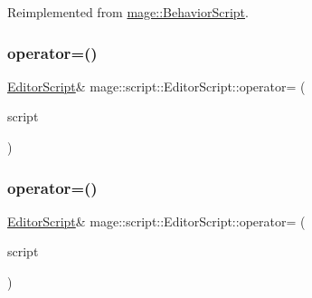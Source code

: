 Reimplemented from \hyperlink{classmage_1_1_behavior_script_aaf2b9f6666064f5b6a6e21b7f1623584}{mage\+::\+Behavior\+Script}.

\hypertarget{classmage_1_1script_1_1_editor_script_a6970965ac503d8c6566268c6d5b78da1}{}\label{classmage_1_1script_1_1_editor_script_a6970965ac503d8c6566268c6d5b78da1} 
\subsubsection{\texorpdfstring{operator=()}{operator=()}\hspace{0.1cm}{\footnotesize\ttfamily [1/2]}}
{\footnotesize\ttfamily \hyperlink{classmage_1_1script_1_1_editor_script}{Editor\+Script}\& mage\+::script\+::\+Editor\+Script\+::operator= (\begin{DoxyParamCaption}\item[{const \hyperlink{classmage_1_1script_1_1_editor_script}{Editor\+Script} \&}]{script }\end{DoxyParamCaption})\hspace{0.3cm}{\ttfamily [delete]}}

\hypertarget{classmage_1_1script_1_1_editor_script_a7d5c9e19fbdfd81156c623c54dd45709}{}\label{classmage_1_1script_1_1_editor_script_a7d5c9e19fbdfd81156c623c54dd45709} 
\subsubsection{\texorpdfstring{operator=()}{operator=()}\hspace{0.1cm}{\footnotesize\ttfamily [2/2]}}
{\footnotesize\ttfamily \hyperlink{classmage_1_1script_1_1_editor_script}{Editor\+Script}\& mage\+::script\+::\+Editor\+Script\+::operator= (\begin{DoxyParamCaption}\item[{\hyperlink{classmage_1_1script_1_1_editor_script}{Editor\+Script} \&\&}]{script }\end{DoxyParamCaption})\hspace{0.3cm}{\ttfamily [delete]}}

\hypertarget{classmage_1_1script_1_1_editor_script_a6c8c31a738ed0dff9fd3418f55cef21c}{}\label{classmage_1_1script_1_1_editor_script_a6c8c31a738ed0dff9fd3418f55cef21c} 
